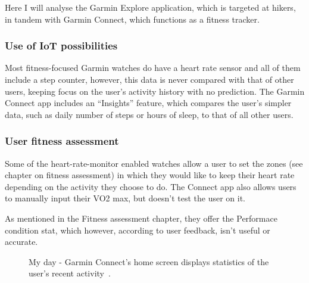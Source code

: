 Here I will analyse the Garmin Explore application, which is targeted at hikers, in tandem with Garmin Connect, which functions as a fitness tracker.

\subsubsection*{Use of IoT possibilities}
Most fitness-focused Garmin watches do have a heart rate sensor and all of them include a step counter, however, this data is never compared with that of other users, keeping focus on the user's activity history with no prediction.
The Garmin Connect app includes an ``Insights'' feature, which compares the user's simpler data, such as daily number of steps or hours of sleep, to that of all other users.
\subsubsection*{User fitness assessment}
Some of the heart-rate-monitor enabled watches allow a user to set the zones (see chapter on fitness assessment) in which they would like to keep their heart rate depending on the activity they choose to do.
The Connect app also allows users to manually input their VO2 max, but doesn't test the user on it.

As mentioned in the Fitness assessment chapter, they offer the Performace condition stat, which however, according to user feedback, isn't useful or accurate.

\begin{figure}[h]
    \centering
        \caption{My day - Garmin Connect's home screen displays statistics of the user's recent activity~\cite{garmin-my-day-img}.}
        \label{garmin-my-day-img}
\end{figure}

